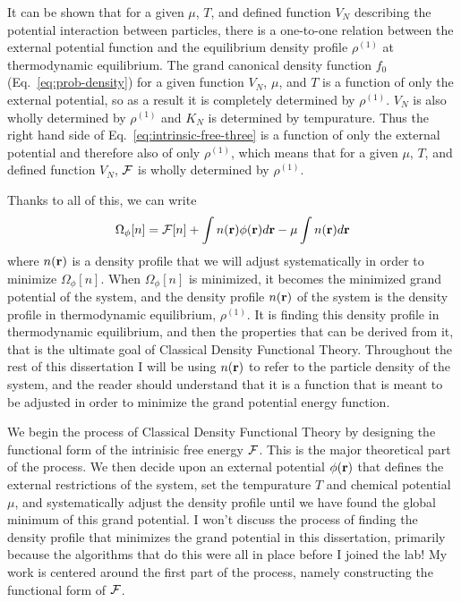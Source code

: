 It can be shown that for a given $\mu$, $T$, and defined function
$V_N$ describing the potential interaction between particles, there is
a one-to-one relation between the external potential function and the
equilibrium density profile $\rho^{(1)}$ at thermodynamic equilibrium.
The grand canonical density function $f_0$ (Eq.~\ref{eq:prob-density})
for a given function $V_N$, $\mu$, and $T$ is a function of only the
external potential, so as a result it is completely determined by
$\rho^{(1)}$.  $V_N$ is also wholly determined by $\rho^{(1)}$ and
$K_N$ is determined by tempurature.  Thus the right hand side of
Eq.~\ref{eq:intrinsic-free-three} is a function of only the external
potential and therefore also of only $\rho^{(1)}$, which means that
for a given $\mu$, $T$, and defined function $V_N$, $\mathcal{F}$ is wholly
determined by $\rho^{(1)}$.

Thanks to all of this, we can write
\begin{align}
  \Omega_{\phi}[n] = \mathcal{F}[n] + \int n(\textbf{r})\phi(\textbf{r})d\textbf{r} - \mu\int n(\textbf{r})d\textbf{r}
\end{align}
where $n(\textbf{r})$ is a density profile that we will adjust systematically
in order to minimize $\Omega_{\phi}[n]$.  When $\Omega_{\phi}[n]$ is
minimized, it becomes the minimized grand potential of the system, and
the density profile $n(\textbf{r})$ of the system is the density profile in
thermodynamic equilibrium, $\rho^{(1)}$.  It is finding this density
profile in thermodynamic equilibrium, and then the properties that can
be derived from it, that is the ultimate goal of Classical Density
Functional Theory.  Throughout the rest of this dissertation I will be
using $n(\textbf{r})$ to refer to the particle density of the system, and the
reader should understand that it is a function that is meant to be
adjusted in order to minimize the grand potential energy function.

We begin the process of Classical Density Functional Theory by
designing the functional form of the intrinisic free energy $\mathcal{F}$.
This is the major theoretical part of the process.  We then decide
upon an external potential $\phi(\textbf{r})$ that defines the external
restrictions of the system, set the tempurature $T$ and chemical
potential $\mu$, and systematically adjust the density profile until
we have found the global minimum of this grand potential.  I won't
discuss the process of finding the density profile that minimizes the
grand potential in this dissertation, primarily because the algorithms
that do this were all in place before I joined the lab!  My work is
centered around the first part of the process, namely constructing the
functional form of $\mathcal{F}$.



